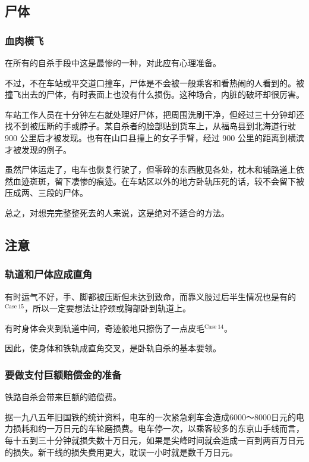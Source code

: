 \documentclass[UTF8]{ctexart}
\begin{document}
\subsection{尸体}

\subsubsection*{血肉横飞}

在所有的自杀手段中这是最惨的一种，对此应有心理准备。

不过，不在车站或平交道口撞车，尸体是不会被一般乘客和看热闹的人看到的。被撞飞出去的尸体，有时表面上也没有什么损伤。这种场合，内脏的破坏却很厉害。

车站工作人员在十分钟左右就处理好尸体，把周围洗刷干净，但经过三十分钟却还找不到被压断的手或脖子。某自杀者的脸部贴到货车上，从福岛县到北海道行驶 900 公里后才被发现。也有在山口县撞上的女子手臂，经过 900 公里的距离到横滨才被发现的例子。

虽然尸体运走了，电车也恢复行驶了，但零碎的东西散见各处，枕木和铺路道上依然血迹斑斑，留下凄惨的痕迹。在车站区以外的地方卧轨压死的话，较不会留下被压成两、三段的尸体。

总之，对想完完整整死去的人来说，这是绝对不适合的方法。

\subsection{注意}

\subsubsection*{轨道和尸体应成直角}

有时运气不好，手、脚都被压断但未达到致命，而靠义肢过后半生情况也是有的$^{\mathrm{Case\ 15}}$，所以一定要想法让脖颈或胸部卧到轨道上。

有时身体会夹到轨道中间，奇迹般地只擦伤了一点皮毛$^{\mathrm{Case\ 14}}$。

因此，使身体和铁轨成直角交叉，是卧轨自杀的基本要领。 

\subsubsection*{要做支付巨额赔偿金的准备}

铁路自杀会带来巨额的赔偿费。

据一九八五年旧国铁的统计资料，电车的一次紧急刹车会造成6000～8000日元的电力损耗和约一万日元的车轮磨损费。电车停一次，以乘客较多的东京山手线而言，每十五到三十分钟就损失数十万日元，如果是尖峰时间就会造成一百到两百万日元的损失。新干线的损失费用更大，耽误一小时就是数千万日元。
\end{document}
